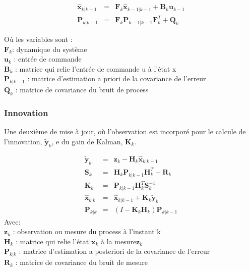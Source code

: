 \begin{equation*}
	\begin{array}{ccl}
		\hat{\textbf{x}}_{k|k-1} &=& \textbf{F}_{k}\hat{\textbf{x}}_{k-1|k-1} + \textbf{B}_{k} \textbf{u}_{k-1}\\
		\textbf{P}_{k|k-1} &=& \textbf{F}_{k} \textbf{P}_{k-1|k-1} \textbf{F}_{k}^{T} + \textbf{Q}_{k}
	\end{array}
\end{equation*}

\noindent Où les variables sont : \\ 
$\textbf{F}_{k}$: dynamique du système \\
$\textbf{u}_{k}$ : entrée de commande \\
$\textbf{B}_{k}$ : matrice qui relie l'entrée de commande u à l'état x \\ 
$\textbf{P}_{k|k-1}$ : matrice d'estimation a priori de la covariance de l'erreur \\
$\textbf{Q}_{k}$ : matrice de covariance du bruit de process

\subsubsection{Innovation}
Une deuxième de mise à jour, où l'observation est incorporé pour le calcule de l'innovation, $\tilde{\textbf{y}}_{k}$, e du gain de Kalman, $\textbf{K}_{k}$.

\begin{equation*}
	\begin{array}{ccl}
		\tilde{\textbf{y}}_{k} &=& \textbf{z}_{k} - \textbf{H}_{k}\hat{\textbf{x}}_{k|k-1} \\
		\textbf{S}_{k} &=& \textbf{H}_{k}\textbf{P}_{k|k-1} \textbf{H}_{k}^{T}+\textbf{R}_{k} \\
		\textbf{K}_{k} &=& \textbf{P}_{k|k-1}\textbf{H}_{k}^{T}\textbf{S}_{k}^{-1} \\
		\hat{\textbf{x}}_{k|k} &=& \hat{\textbf{x}}_{k|k-1} + \textbf{K}_{k}\tilde{\textbf{y}}_{k} \\
		\textbf{P}_{k|k} &=& (I - \textbf{K}_{k} \textbf{H}_{k}) \textbf{P}_{k|k-1}
	\end{array}
\end{equation*}
\noindent Avec: \\
$\textbf{z}_{k}$ : observation ou mesure du process à l'instant k \\
$\textbf{H}_{k}$ : matrice qui relie l'état $\textbf{x}_{k}$ à la mesure$ \textbf{z}_{k}$\\
$\textbf{P}_{k|k}$ : matrice d'estimation a posteriori de la covariance de l'erreur\\
$\textbf{R}_{k}$ : matrice de covariance du bruit de mesure


